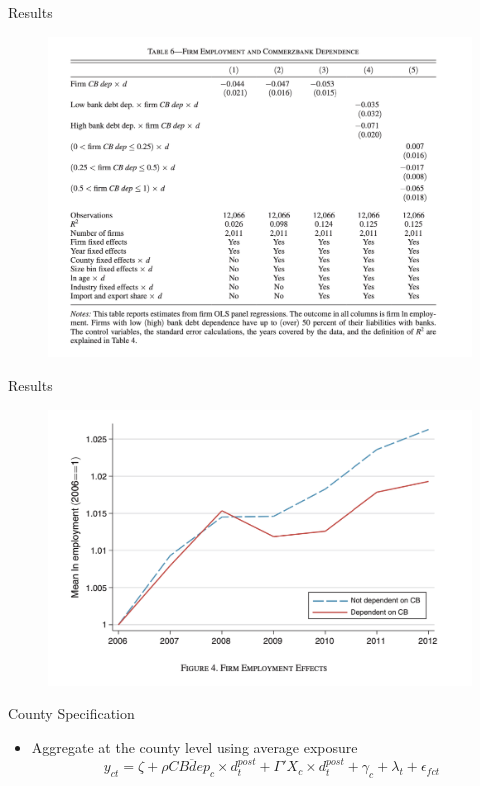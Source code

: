 \documentclass[english,xcolor=svgnames]{beamer}
\begin{document}
\begin{frame}{Results}
\begin{figure}
\includegraphics[scale=0.45]{figures/huber_3}
\end{figure}
\end{frame}


\begin{frame}{Results}
\begin{figure}
\includegraphics[scale=0.45]{figures/huber_4}
\end{figure}
\end{frame}

\begin{frame}{County Specification}
\begin{itemize}
\item Aggregate at the county level using average exposure
\[y_{ct} = \zeta + \rho \overline{CBdep_c} \times d^{post}_t + \Gamma' X_{c} \times d^{post}_t + \gamma_{c} + \lambda_t + \epsilon_{fct} \]
\end{itemize}
\end{frame}
\end{document}

